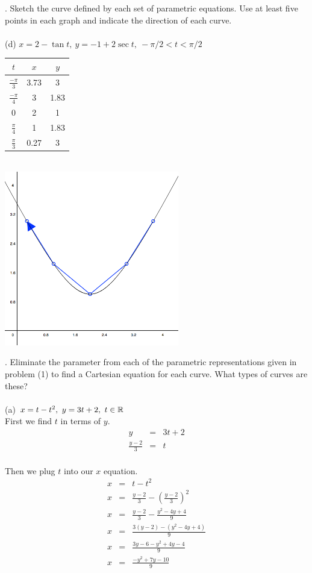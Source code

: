 \documentclass[11pt]{exam}
\begin{document}
. Sketch the curve defined by each set of parametric equations. Use at least five points in each graph and indicate the direction of each curve. \\
\\
\indent (d) $x = 2 - \tan t,\ y = -1 + 2\sec t,\ -\pi/2 < t < \pi/2 $\\
\newline
\newline
\def\arraystretch{1.5}
\begin{tabular}{ c|c|c }
  $t$ & $x$ & $y$ \\
  \hline
  $\frac{-\pi}{3}$ & 3.73 & 3    \\
  $\frac{-\pi}{4}$ & 3    & 1.83 \\
   0               & 2    & 1    \\
  $\frac{\pi}{4}$  & 1    & 1.83 \\
  $\frac{\pi}{3}$  & 0.27 & 3    \\
\end{tabular}\\
\includegraphics[width=3in]{g1d.png}




. Eliminate the parameter from each of the parametric representations given in problem (1) to find a Cartesian equation for each curve. What types of curves are these? \\
\\
\indent (a) $x = t - t^2,\ y = 3t + 2,\ t \in \Bbb{R} $\\
\newline
\newline
First we find $t$ in terms of $y$.
\begin{eqnarray*}
y&=&3t+2\\
\frac{y-2}{3}&=&t
\end{eqnarray*}
\\
Then we plug $t$ into our $x$ equation.
\begin{eqnarray*}
x&=&t-t^2\\
x&=&\frac{y-2}{3}-\left(\frac{y-2}{3}\right)^2\\
x&=&\frac{y-2}{3}-\frac{y^2-4y+4}{9}\\
x&=&\frac{3(y-2) - (y^2-4y+4)}{9}\\
x&=&\frac{3y-6 - y^2+4y-4}{9}\\
x&=&\frac{-y^2+7y-10}{9}
\end{eqnarray*}
\end{document}
